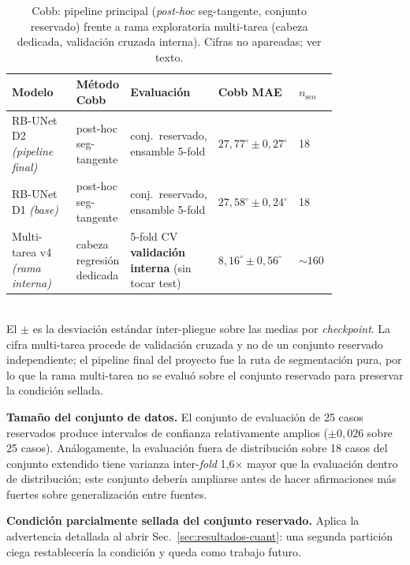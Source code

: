 \documentclass[conference]{IEEEtran}
\begin{document}
\begin{table}[htbp]
\caption{Cobb: pipeline principal (\emph{post-hoc} seg-tangente, conjunto reservado) frente a rama exploratoria multi-tarea (cabeza dedicada, validación cruzada interna). Cifras no apareadas; ver texto.}
\label{tab:cobb-methods}
\begin{center}
\renewcommand{\arraystretch}{1.15}
\footnotesize
\begin{tabular}{@{}p{0.20\linewidth}p{0.16\linewidth}p{0.18\linewidth}p{0.16\linewidth}p{0.12\linewidth}@{}}
\toprule
\textbf{Modelo} & \textbf{Método Cobb} & \textbf{Evaluación} & \textbf{Cobb MAE} & \textbf{$n_{\text{sco}}$} \\
\midrule
RB-UNet D2 \emph{(pipeline final)} & post-hoc seg-tangente & conj.\ reservado, ensamble 5-fold & $27{,}77^{\circ} \pm 0{,}27^{\circ}$ & 18 \\
RB-UNet D1 \emph{(base)}           & post-hoc seg-tangente & conj.\ reservado, ensamble 5-fold & $27{,}58^{\circ} \pm 0{,}24^{\circ}$ & 18 \\
Multi-tarea v4 \emph{(rama interna)} & cabeza regresión dedicada \cite{kendall_uncertainty} & 5-fold CV \textbf{validación interna} (sin tocar test) & $8{,}16^{\circ} \pm 0{,}56^{\circ}$ & $\sim 160$ \\
\bottomrule
\end{tabular}\\[2pt]
{\scriptsize El $\pm$ es la desviación estándar inter-pliegue sobre las medias por \emph{checkpoint}. La cifra multi-tarea procede de validación cruzada y no de un conjunto reservado independiente; el pipeline final del proyecto fue la ruta de segmentación pura, por lo que la rama multi-tarea no se evaluó sobre el conjunto reservado para preservar la condición sellada.}
\end{center}
\end{table}

\textbf{Tamaño del conjunto de datos.} El conjunto de evaluación de 25 casos reservados produce intervalos de confianza relativamente amplios ($\pm 0{,}026$ sobre 25 casos). Análogamente, la evaluación fuera de distribución sobre 18 casos del conjunto extendido tiene varianza inter-\emph{fold} 1{,}6$\times$ mayor que la evaluación dentro de distribución; este conjunto debería ampliarse antes de hacer afirmaciones más fuertes sobre generalización entre fuentes.

\textbf{Condición parcialmente sellada del conjunto reservado.} Aplica la advertencia detallada al abrir Sec.~\ref{sec:resultados-cuant}: una segunda partición ciega restablecería la condición y queda como trabajo futuro.
\end{document}
